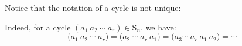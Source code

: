 \documentclass[11pt,dvipsnames]{book}
\numberwithin{equation}{section} %
\numberwithin{figure}{section} %
\numberwithin{table}{section} %
\begin{document}
%
%
%
%
%
%
%
%
%
%
%

Notice that the notation of a cycle is not unique:


 Indeed, for a cycle $(a_{1}\ a_{2}\ \cdots\
a_{r})\in\mathrm{S}_n$, we have:
\begin{equation}
\label{e:rotations}
\big(a_{1}\ a_{2}\ \cdots\ a_{r}\big)=\big(a_{2}\ \cdots\ a_{r}\ a_{1}\big)=\big(a_{3}\cdots\ a_{r}\ a_{1}\ a_{2}\big)=\cdots%
\end{equation}
\end{document}
